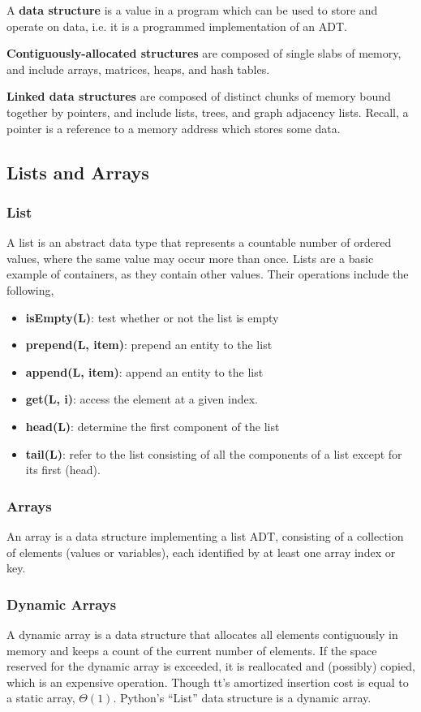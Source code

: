 \documentclass{article}
\begin{document}
    A \textbf{data structure} is a value in a program which can be used to store and operate on data, i.e. it is a programmed implementation of an ADT.
    
    \textbf{Contiguously-allocated structures} are composed of single slabs of memory, and include arrays, matrices, heaps, and hash tables.
     
    \textbf{Linked data structures} are composed of distinct chunks of memory bound together by pointers, and include lists, trees, and graph adjacency lists. Recall, a pointer is a reference to a memory address which stores some data.

    \subsection{Lists and Arrays}
    \subsubsection{List}
    A list is an abstract data type that represents a countable number of ordered values, where the same value may occur more than once. Lists are a basic example of containers, as they contain other values. Their operations include the following,
    \begin{itemize}
        \item \textbf{isEmpty(L)}: test whether or not the list is empty
        \item \textbf{prepend(L, item)}: prepend an entity to the list
        \item \textbf{append(L, item)}: append an entity to the list
        \item \textbf{get(L, i)}: access the element at a given index.
        \item \textbf{head(L)}: determine the first component of the list
        \item \textbf{tail(L)}: refer to the list consisting of all the components of a list except for its first (head).
    \end{itemize}
    
    \subsubsection{Arrays}
    An array is a data structure implementing a list ADT, consisting of a collection of elements (values or variables), each identified by at least one array index or key. 
    
    \subsubsection{Dynamic Arrays}
    A dynamic array is a data structure that allocates all elements contiguously in memory and keeps a count of the current number of elements. If the space reserved for the dynamic array is exceeded, it is reallocated and (possibly) copied, which is an expensive operation. Though tt's amortized insertion cost is equal to a static array, $\Theta(1)$. Python's  ``List'' data structure is a dynamic array.
    
\end{document}
